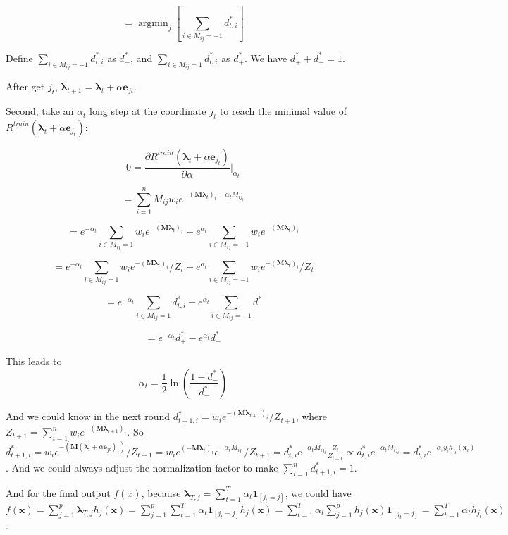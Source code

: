 \documentclass[paper=letter, fontsize=12pt]{article}
\DeclareMathOperator*{\argmin}{argmin}
\begin{document}
\begin{enumerate}[label=(\alph*)]
	$$= \argmin_j [\sum_{i \in M_{ij} = -1} d^*_{t, i}]$$
	
	Define $\sum_{i \in M_{ij} = -1} d^*_{t, i}$ as $d^*_{-}$, and $\sum_{i \in M_{ij} = 1} d^*_{t, i}$ as $d^*_{+}$. We have $d^*_{+} + d^*_{-} = 1$.
	
	After get $j_t$, $\mathbf{\lambda}_{t+1} = \mathbf{\lambda}_t + \alpha \mathbf{e}_{jt}$.
	
	Second, take an $\alpha_t$ long step at the coordinate $j_t$ to reach the minimal value of $R^{train}(\mathbf{\lambda}_t + \alpha \mathbf{e}_{j_t})$:
	
	$$0 = \frac{\partial R^{train}(\mathbf{\lambda}_t + \alpha \mathbf{e}_{j_t})}{\partial \alpha} |_{\alpha_t}$$
	
	$$= \sum_{i = 1}^{n} M_{ij} w_i e^{-(\mathbf{M} \mathbf{\lambda}_t)_i - \alpha_t M_{i j_t}}$$
	
	$$= e^{-\alpha_t} \sum_{i \in M_{ij} = 1} w_i e^{-(\mathbf{M} \mathbf{\lambda}_t)_i} - e^{\alpha_t} \sum_{i \in M_{ij} = -1} w_i e^{-(\mathbf{M} \mathbf{\lambda}_t)_i}$$
	
	$$= e^{-\alpha_t} \sum_{i \in M_{ij} = 1} w_i e^{-(\mathbf{M} \mathbf{\lambda}_t)_i} / Z_t - e^{\alpha_t} \sum_{i \in M_{ij} = -1} w_i e^{-(\mathbf{M} \mathbf{\lambda}_t)_i} / Z_t$$
	
	$$= e^{-\alpha_t} \sum_{i \in M_{ij} = 1} d^*_{t, i} - e^{\alpha_t} \sum_{i \in M_{ij} = -1} d^*$$
	
	$$= e^{-\alpha_t} d^*_{+}  - e^{\alpha_t} d^*_{-}$$
	
	This leads to $$\alpha_t = \frac{1}{2} \ln(\frac{1 - d^*_{-}}{d^*_{-}})$$
	
	And we could know in the next round $d^*_{t+1, i} = w_i e^{-(\mathbf{M} \mathbf{\lambda}_{t+1})_i} / Z_{t+1}$, where $Z_{t+1} = \sum_{i = 1}^{n} w_i e^{-(\mathbf{M} \mathbf{\lambda}_{t+1})_i}$. So
	$d^*_{t+1, i} = w_i e^{-(\mathbf{M} (\mathbf{\lambda}_t + \alpha \mathbf{e}_{jt})_i)} / Z_{t+1} = w_i e^{(-\mathbf{M} \mathbf{\lambda}_t)_i} e^{-\alpha_t M_{ij_t}} / Z_{t+1} = d^*_{t, i} e^{-\alpha_t M_{ij_t}} \frac{Z_t}{Z_{t+1}} \propto d^*_{t, i} e^{-\alpha_t M_{ij_t}} = d^*_{t, i} e^{-\alpha_t y_i h_{j_t}(\mathbf{x}_i)}$. And we could always adjust the normalization factor to make $\sum_{i = 1}^{n} d^*_{t+1, i} = 1$.
	
	And for the final output $f(x)$, because $\mathbf{\lambda}_{T, j} = \sum_{t = 1}^{T} \alpha_t \mathbf{1}_{[j_t = j]}$, we could have $f(\mathbf{x}) = \sum_{j = 1}^{p} \mathbf{\lambda}_{T, j} h_j(\mathbf{x}) =  \sum_{j = 1}^{p}  \sum_{t = 1}^{T} \alpha_t \mathbf{1}_{[j_t = j]} h_j(\mathbf{x}) = \sum_{t = 1}^{T} \alpha_t \sum_{j = 1}^{p} h_j(\mathbf{x}) \mathbf{1}_{[j_t = j]} = \sum_{t = 1}^{T} \alpha_t h_{j_t}(\mathbf{x})$.
	

\end{enumerate}
\end{document}
